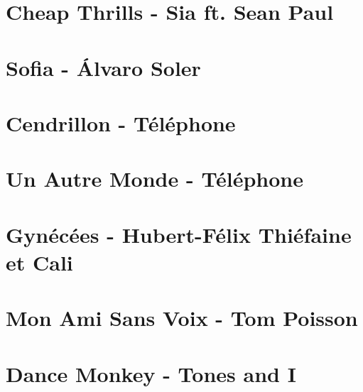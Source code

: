 \documentclass{guitartabs}
\begin{document}
\section{Cheap Thrills - Sia ft. Sean Paul}
\begin{guitar}

\end{guitar}


\section{Sofia - Álvaro Soler}
\begin{guitar}

\end{guitar}

\section{Cendrillon - Téléphone}
\begin{guitar}

\end{guitar}

\section*{Un Autre Monde - Téléphone}
\begin{guitar}

\end{guitar}

\section{Gynécées - Hubert-Félix Thiéfaine et Cali}
\begin{guitar}

\end{guitar}


\section*{Mon Ami Sans Voix - Tom Poisson}
\begin{guitar}

\end{guitar}

\section{Dance Monkey - Tones and I}
\begin{guitar}

\end{guitar}
\end{document}
